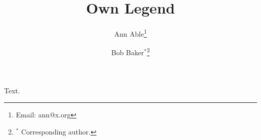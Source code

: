 \documentclass{article}
\title{Own Legend}
\author[1]{Ann Able\thanks{Email: ann@x.org}}
\author[2]{Bob Baker$^\ast$\thanks{$^\ast$ Corresponding author.}}
\affil[1]{Univ A}
\affil[2]{Univ B}
\begin{document}
\maketitle
Text.
\end{document}
